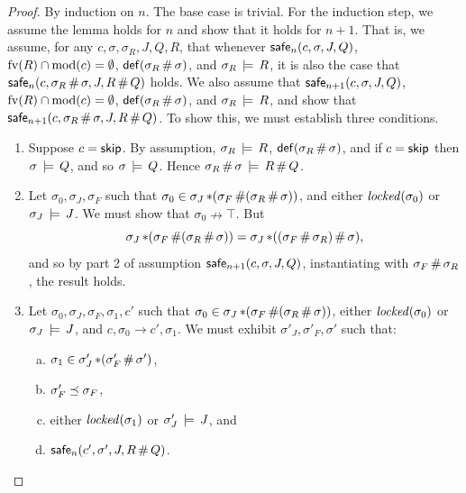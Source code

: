 \documentclass[11pt]{article}
\begin{document}
\begin{proof}
	By induction on $n$. The base case is trivial. For the induction step, we assume the lemma holds for $n$ and show that it holds for $n+1$. That is, we assume, for any $c,\sigma,\sigma_R,J,Q,R$, that whenever $\mathsf{safe}_{n}(c,\sigma,J,Q)$, $\mathrm{fv}(R) \cap \mathrm{mod}(c) = \operatorname{\emptyset}$, $\mathsf{def}(\sigma_R \operatorname{\#} \sigma)$, and $\sigma_R \,\models\, R$, it is also the case that $\mathsf{safe}_{n}(c,\sigma_R \operatorname{\#} \sigma,J,R \operatorname{\#} Q)$ holds. We also assume that $\mathsf{safe}_{n+1}(c,\sigma,J,Q)$, $\mathrm{fv}(R) \cap \mathrm{mod}(c) = \operatorname{\emptyset}$, $\mathsf{def}(\sigma_R \operatorname{\#} \sigma)$, and $\sigma_R \,\models\, R$, and show that \\ 
	$\mathsf{safe}_{n+1}(c,\sigma_R \operatorname{\#} \sigma,J,R \operatorname{\#} Q)$. To show this, we must establish three conditions. 

	\begin{enumerate}
		\item Suppose $c = \operatorname{\mathsf{skip}}$. By assumption, $\sigma_R \,\models\, R$, $\mathsf{def}(\sigma_R \operatorname{\#} \sigma)$, and if $c = \operatorname{\mathsf{skip}}$ then $\sigma \,\models\, Q$, and so $\sigma \,\models\, Q$. Hence $\sigma_R \operatorname{\#} \sigma \,\models\, R \operatorname{\#} Q$. 

		\item Let $\sigma_0,\sigma_J,\sigma_F$ such that $\sigma_0 \in \sigma_J \operatorname{\ast} (\sigma_F \operatorname{\#} (\sigma_R \operatorname{\#} \sigma))$, and either $\mathit{locked}(\sigma_0)$ or $\sigma_J \,\models\, J$. We must show that $\sigma_0 \nrightarrow \top$. But \[ \sigma_J \operatorname{\ast} (\sigma_F \operatorname{\#} (\sigma_R \operatorname{\#} \sigma)) = \sigma_J \operatorname{\ast} ((\sigma_F \operatorname{\#} \sigma_R) \operatorname{\#} \sigma),\] and so by part 2 of assumption $\mathsf{safe}_{n+1}(c,\sigma,J,Q)$, instantiating with $\sigma_F \operatorname{\#} \sigma_R$, the result holds. 

		\item Let $\sigma_0,\sigma_J,\sigma_F,\sigma_1,c'$ such that $\sigma_0 \in \sigma_J \operatorname{\ast} (\sigma_F \operatorname{\#} (\sigma_R \operatorname{\#} \sigma))$, either $\mathit{locked}(\sigma_0)$ or $\sigma_J \,\models\, J$, and $c,\sigma_0 \rightarrow c',\sigma_1$. We must exhibit $\sigma'_J,\sigma'_F,\sigma'$ such that: \begin{enumerate}[(a)]
			\item $\sigma_1 \in \sigma'_J \operatorname{\ast} (\sigma'_F \operatorname{\#} \sigma')$,
			\item $\sigma'_F \preceq \sigma_F$, 
			\item either $\mathit{locked}(\sigma_1)$ or $\sigma'_J \,\models\, J$, and
			\item $\mathsf{safe}_{n}(c',\sigma',J,R \operatorname{\#} Q)$. 
		\end{enumerate}


\end{enumerate}
\end{proof}
\end{document}
